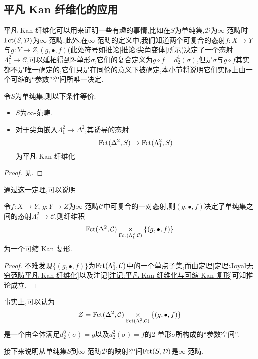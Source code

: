 \subsection{平凡 Kan 纤维化的应用}\label{平凡 Kan 纤维化的应用}
平凡 Kan 纤维化可以用来证明一些有趣的事情,比如在$S$为单纯集,$\mathcal{D}$为$\infty$-范畴时$\operatorname{Fct}(S,\mathcal{D})$为$\infty$-范畴.此外,在$\infty$-范畴的定义中,我们知道两个可复合的态射$f: X \to Y$与$g : Y \to Z$,$(g,\bullet,f)$(此处符号如推论\ref{推论:尖角变体}所示)决定了一个态射$\Lambda_1^2 \to \mathcal{C}$,可以延拓得到$2$-单形$\sigma$,它们的复合定义为$g\circ f = d_2^1(\sigma)$,但是$\sigma$与$g\circ f$其实都不是唯一确定的,它们只是在同伦的意义下被确定,本小节将说明它们实际上由一个可缩的``参数''空间所唯一决定.
\begin{theorem}[Joyal]\label{定理:Joyal无穷范畴平凡 Kan 纤维化}
    令$S$为单纯集,则以下条件等价:
    \begin{itemize}
        \item $S$为$\infty$-范畴.
        \item 对于尖角嵌入$\Lambda_1^2 \to \Delta^2$,其诱导的态射
        \[
            \operatorname{Fct}(\Delta^2 , S)\to \operatorname{Fct}(\Lambda_1^2 ,S)
        \]
        为平凡 Kan 纤维化
    \end{itemize}
\end{theorem}
\begin{proof}
    见\parencite[\href{https://kerodon.net/tag/0079}{0079}]{Kerodon}.
\end{proof}
通过这一定理,可以说明
\begin{corollary}
    令$f: X \to Y$, $g : Y \to Z$为$\infty$-范畴$\mathcal{C}$中可复合的一对态射,则$(g,\bullet,f)$决定了单纯集之间的态射$\Lambda_1^2 \to \mathcal{C}$.则纤维积
    \[
    \operatorname{Fct}(\Delta^2,\mathcal{C})\underset{\operatorname{Fct}(\Lambda_1^2,\mathcal{C})}{\times}\{(g,\bullet,f)\}
    \]
    为一个可缩 Kan 复形.
\end{corollary}
\begin{proof}
    不难发现$\{(g,\bullet,f)\}$为$\operatorname{Fct}(\Lambda_1^2,\mathcal{C})$中的一个单点子集,而由定理\ref{定理:Joyal无穷范畴平凡 Kan 纤维化}以及注记\ref{注记:平凡 Kan 纤维化与可缩 Kan 复形}可知推论成立.
\end{proof}
\begin{remark}
    事实上,可以认为
    \[
        Z = \operatorname{Fct}(\Delta^2,\mathcal{C})\underset{\operatorname{Fct}(\Lambda_1^2,\mathcal{C})}{\times}\{(g,\bullet,f)\}
    \]
    是一个由全体满足$d_2^0(\sigma) = g$以及$d_2^2(\sigma) = f$的$2$-单形$\sigma$所构成的``参数空间''.
\end{remark}
接下来说明从单纯集$S$到$\infty$-范畴$\mathcal{D}$的映射空间$\operatorname{Fct}(S,\mathcal{D})$是$\infty$-范畴.

